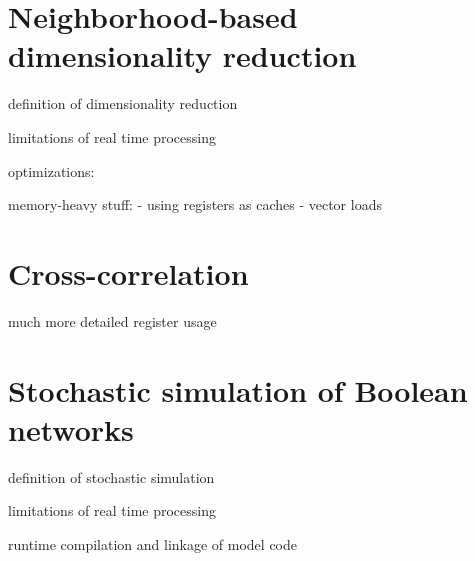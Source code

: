 \section{Neighborhood-based dimensionality reduction}

definition of dimensionality reduction

limitations of real time processing


optimizations:

memory-heavy stuff:
- using registers as caches
- vector loads

\section{Cross-correlation}

much more detailed register usage 

\section{Stochastic simulation of Boolean networks}

definition of stochastic simulation

limitations of real time processing

runtime compilation and linkage of model code